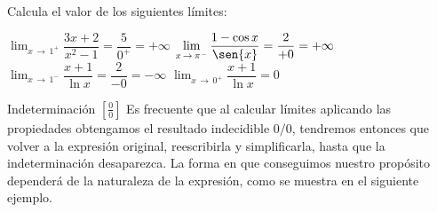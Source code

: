 \begin{ejemplo}{
Calcula el valor de los siguientes límites:
\begin{apartadosc}
 \ap $\displaystyle{\lim_{x\,\to\,1^+}\dfrac{3x+2}{x^2-1}=\dfrac5{0^+}=+\infty}$
 \ap $\displaystyle{\lim_{x\,\to\,\pi^-}\dfrac{1-\cos{x}}{\sen{x}}=\dfrac2{+0}=+\infty}$
 \ap $\displaystyle{\lim_{x\,\to\,1^-}\dfrac{x+1}{\ln{x}}=\dfrac2{-0}=-\infty}$
 \ap $\displaystyle{\lim_{x\,\to\,0^+}\dfrac{x+1}{\ln{x}}=0}$
\end{apartadosc}
}
\end{ejemplo}

\begin{definicion}{Indeterminación $\left[\frac00\right]$}
Es frecuente que al calcular límites aplicando las propiedades obtengamos el resultado indecidible $0/0$, tendremos entonces que volver a la expresión original, reescribirla y simplificarla, hasta que la indeterminación desaparezca. La forma en que conseguimos nuestro propósito dependerá de la naturaleza de la expresión, como se muestra en el siguiente ejemplo.
\end{definicion}

